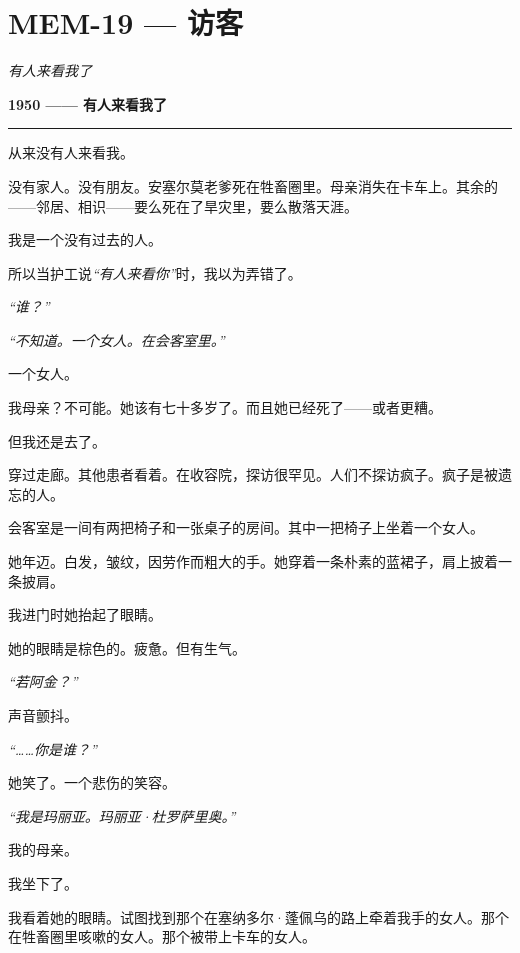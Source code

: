 \section*{\textbf{MEM-19} --- 访客}

\noindent \textit{有人来看我了}

\noindent \textbf{1950 —— 有人来看我了}

\vspace{0.5em}\noindent\rule{\textwidth}{0.5pt}\vspace{0.5em}

\noindent 从来没有人来看我。

\noindent 没有家人。没有朋友。安塞尔莫老爹死在牲畜圈里。母亲消失在卡车上。其余的——邻居、相识——要么死在了旱灾里，要么散落天涯。

\noindent 我是一个没有过去的人。

\noindent 所以当护工说\textit{“有人来看你”}时，我以为弄错了。

\noindent \textit{“谁？”}

\noindent \textit{“不知道。一个女人。在会客室里。”}

\noindent 一个女人。

\noindent 我母亲？不可能。她该有七十多岁了。而且她已经死了——或者更糟。

\noindent 但我还是去了。

\noindent 穿过走廊。其他患者看着。在收容院，探访很罕见。人们不探访疯子。疯子是被遗忘的人。

\noindent 会客室是一间有两把椅子和一张桌子的房间。其中一把椅子上坐着一个女人。

\noindent 她年迈。白发，皱纹，因劳作而粗大的手。她穿着一条朴素的蓝裙子，肩上披着一条披肩。

\noindent 我进门时她抬起了眼睛。

\noindent 她的眼睛是棕色的。疲惫。但有生气。

\noindent \textit{“若阿金？”}

\noindent 声音颤抖。

\noindent \textit{“……你是谁？”}

\noindent 她笑了。一个悲伤的笑容。

\noindent \textit{“我是玛丽亚。玛丽亚·杜罗萨里奥。”}

\noindent 我的母亲。

\noindent 我坐下了。

\noindent 我看着她的眼睛。试图找到那个在塞纳多尔·蓬佩乌的路上牵着我手的女人。那个在牲畜圈里咳嗽的女人。那个被带上卡车的女人。

